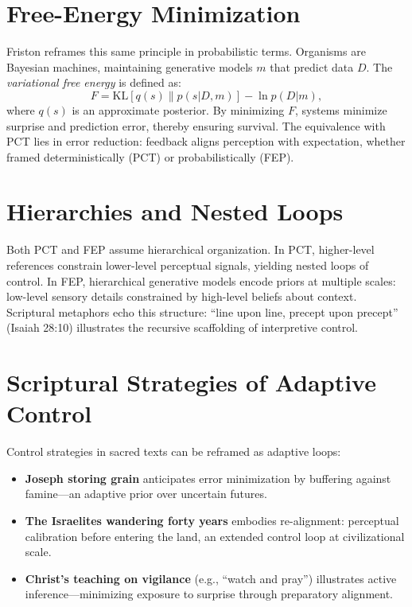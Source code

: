 \documentclass[a4paper,11pt,openany]{book}
\begin{document}
\section{Free-Energy Minimization}
Friston reframes this same principle in probabilistic terms.  
Organisms are Bayesian machines, maintaining generative models $m$ that predict data $D$.  
The \emph{variational free energy} is defined as:
\[
F = \mathrm{KL}[q(s) \| p(s|D,m)] - \ln p(D|m),
\]
where $q(s)$ is an approximate posterior. By minimizing $F$, systems minimize surprise 
and prediction error, thereby ensuring survival. The equivalence with PCT lies in error reduction: 
feedback aligns perception with expectation, whether framed deterministically (PCT) or 
probabilistically (FEP).

\section{Hierarchies and Nested Loops}
Both PCT and FEP assume hierarchical organization.  
In PCT, higher-level references constrain lower-level perceptual signals, yielding 
nested loops of control.  
In FEP, hierarchical generative models encode priors at multiple scales: low-level sensory 
details constrained by high-level beliefs about context.  
Scriptural metaphors echo this structure: “line upon line, precept upon precept” 
(Isaiah 28:10) illustrates the recursive scaffolding of interpretive control.

\section{Scriptural Strategies of Adaptive Control}
Control strategies in sacred texts can be reframed as adaptive loops:
\begin{itemize}
  \item \textbf{Joseph storing grain} anticipates error minimization by buffering against 
  famine—an adaptive prior over uncertain futures.  
  \item \textbf{The Israelites wandering forty years} embodies re-alignment: perceptual 
  calibration before entering the land, an extended control loop at civilizational scale.  
  \item \textbf{Christ’s teaching on vigilance} (e.g., “watch and pray”) illustrates active 
  inference—minimizing exposure to surprise through preparatory alignment.  
\end{itemize}
\end{document}
